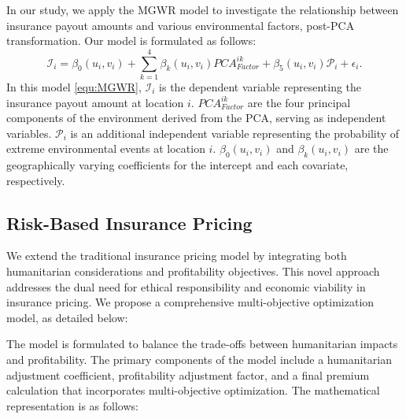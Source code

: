 \documentclass[12pt]{article}
\begin{document}
In our study, we apply the MGWR model to investigate the relationship between insurance payout amounts and various environmental factors, post-PCA transformation. Our model is formulated as follows:
\begin{equation}
\mathcal{I}_i = \beta_0(u_i,v_i) + \sum_{k=1}^{4} \beta_k(u_i,v_i)PCA_{Factor}^{ik} + \beta_5(u_i,v_i)\mathcal{P}_i + \epsilon_i.
\label{equ:MGWR}
\end{equation}
In this model \ref{equ:MGWR}, 
$\mathcal{I}_i$ is the dependent variable representing the insurance payout amount at location $i$.
$PCA_{Factor}^{ik}$ are the four principal components of the environment derived from the PCA, serving as independent variables.
$\mathcal{P}_i$ is an additional independent variable representing the probability of extreme environmental events at location $i$.
$\beta_0\left(u_i, v_i\right)$ and $\beta_k\left(u_i, v_i\right)$ are the geographically varying coefficients for the intercept and each covariate, respectively.



\subsection{Risk-Based Insurance Pricing}
We extend the traditional insurance pricing model by integrating both humanitarian considerations and profitability objectives. This novel approach addresses the dual need for ethical responsibility and economic viability in insurance pricing. We propose a comprehensive multi-objective optimization model, as detailed below:

The model is formulated to balance the trade-offs between humanitarian impacts and profitability. The primary components of the model include a humanitarian adjustment coefficient, profitability adjustment factor, and a final premium calculation that incorporates multi-objective optimization. The mathematical representation is as follows:
\end{document}
